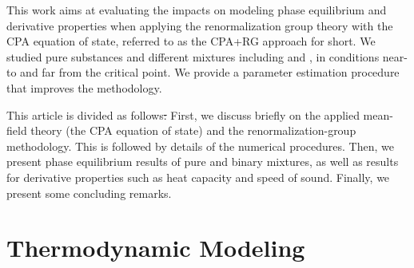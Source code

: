 \documentclass[preprint,12pt,3p]{elsarticle}
\providecommand{\DIFadd}[1]{{\protect\color{blue}\uwave{#1}}} %
\providecommand{\DIFdel}[1]{{\protect\color{red}\sout{#1}}}                      %
\providecommand{\DIFaddbegin}{} %
\providecommand{\DIFaddend}{} %
\providecommand{\DIFdelbegin}{} %
\providecommand{\DIFdelend}{} %
\begin{document}
	This work aims at evaluating the impacts on modeling phase equilibrium and derivative properties when applying the renormalization group theory with the CPA equation of state, referred to as the CPA+RG approach for short. We studied pure substances and different mixtures including  and \DIFdelbegin \DIFdel{}\DIFdelend \DIFaddbegin \DIFadd{\ce{H_2S}}\DIFaddend , in conditions near-to and far from the critical point. We provide a parameter estimation procedure that improves the methodology.

	This article is divided as follows\DIFdelbegin \DIFdel{: }\DIFdelend \DIFaddbegin \DIFadd{. }\DIFaddend First, we discuss briefly on the applied mean-field theory (the CPA equation of state) and the renormalization-group methodology. This is followed by details of the numerical procedures. Then, we present phase equilibrium results of pure and binary mixtures, as well as results for derivative properties such as heat capacity and speed of sound. Finally, we present some concluding remarks.

\section{Thermodynamic Modeling}
\DIFaddbegin 
\end{document}

